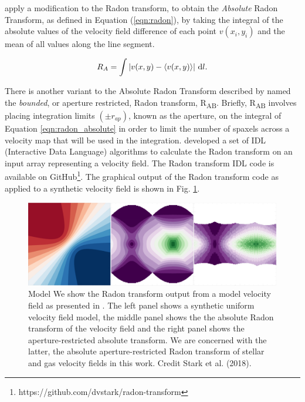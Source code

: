 \citet{2018MNRAS.480.2217S} apply a modification to the Radon transform, to obtain the \textit{Absolute} Radon Transform, as defined in Equation (\ref{eqn:radon}), by taking the integral of the absolute values of the velocity field difference of each point $v(x_i,y_i)$ and the mean of all values along the line segment.

\begin{equation}
    \label{eqn:radon_absolute}
    R_A=\int{| v(x,y) - \langle v(x,y) \rangle | \, \mathop{}\!\mathrm{d}l}.
\end{equation}

There is another variant to the Absolute Radon Transform described by \citet{2018MNRAS.480.2217S} named the \textit{bounded}, or aperture restricted, Radon transform, R\textsubscript{AB}. Briefly, R\textsubscript{AB} involves placing integration limits $(\pm{r_{ap}})$, known as the aperture, on the integral of Equation \ref{eqn:radon_absolute} in order to limit the number of spaxels across a velocity map that will be used in the integration. \citet{2018MNRAS.480.2217S} developed a set of IDL (Interactive Data Language) algorithms to calculate the Radon transform on an input array representing a velocity field. The Radon transform IDL code is available on GitHub\footnote{https://github.com/dvstark/radon-transform}. 
The graphical output of the Radon transform code as applied to a synthetic velocity field is shown in Fig. \ref{fig:Radon}.

\begin{figure}
    \centering
   	\includegraphics[width=\columnwidth]{images/RadonPlots/example.png}
    \caption[Model velocity field Radon transform plots]{Model We show the Radon transform output from a model velocity field as presented in \citet{2018MNRAS.480.2217S}. The left panel shows a synthetic uniform velocity field model, the middle panel shows the the absolute Radon transform of the velocity field and the right panel shows the aperture-restricted absolute transform. We are concerned with the latter, the absolute aperture-restricted Radon transform of stellar and gas velocity fields in this work. Credit Stark et al. (2018).}
    \label{fig:Radon}
\end{figure}

